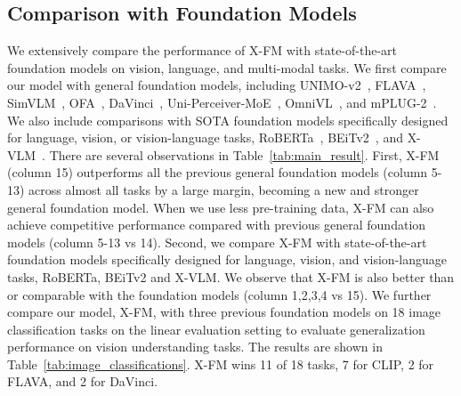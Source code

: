 \documentclass[11pt]{article}
\newcommand{\ModelName}{X-FM\xspace}
\newcommand{\ModelNameB}{X-FM\xspace}
\newcommand{\babyx}{X-VLM}
\begin{document}
\subsection{Comparison with Foundation Models}
\label{sec:exp_fm}

We extensively compare the performance of {\ModelName} with state-of-the-art foundation models on vision, language, and multi-modal tasks. We first compare our model with general foundation models, including UNIMO-v2~\citep{li2021unimo}, FLAVA~\citep{singh2021flava}, SimVLM~\citep{wang2021simvlm}, OFA~\citep{wang2022ofa}, DaVinci~\citep{diao2022prefix}, 
Uni-Perceiver-MoE~\citep{zhu2022uni},
OmniVL~\citep{wang2022omnivl}, and mPLUG-2~\citep{xu2023mplug}. We also include comparisons with SOTA foundation models specifically designed for language, vision, or vision-language tasks, RoBERTa~\citep{liu2019roberta}, BEiTv2~\citep{peng2022beit}, and {\babyx}~\citep{zeng2022x}. 
There are several observations in Table~\ref{tab:main_result}.
First, {\ModelNameB} (column 15) outperforms all the previous general foundation models (column 5-13) across almost all tasks by a large margin, becoming a new and stronger general foundation model. When we use less pre-training data, {\ModelName} can also achieve competitive performance compared with previous general foundation models (column 5-13 vs 14).
Second, we compare {\ModelName} with state-of-the-art foundation models specifically designed for language, vision, and vision-language tasks, RoBERTa, BEiTv2 and {\babyx}. We observe that {\ModelName} is also better than or comparable with the foundation models (column 1,2,3,4 vs 15).
We further compare our model, {\ModelNameB}, with three previous foundation models on 18 image classification tasks on the linear evaluation setting to evaluate generalization performance on vision understanding tasks. The results are shown in Table~\ref{tab:image_classifications}. {\ModelNameB} wins 11 of 18 tasks, 7 for CLIP, 2 for FLAVA, and 2 for DaVinci.
\end{document}
